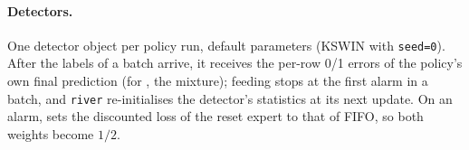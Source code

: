\paragraph{Detectors.} One detector object per policy run, default parameters (KSWIN with \texttt{seed=0}). After the
labels of a batch arrive, it receives the per-row 0/1 errors of the policy's own final prediction (for \hedge, the
mixture); feeding stops at the first alarm in a batch, and \texttt{river} re-initialises the detector's statistics at
its next update. On an alarm, \hedge{} sets the discounted loss of the reset expert to that of FIFO, so both weights
become $1/2$. %
